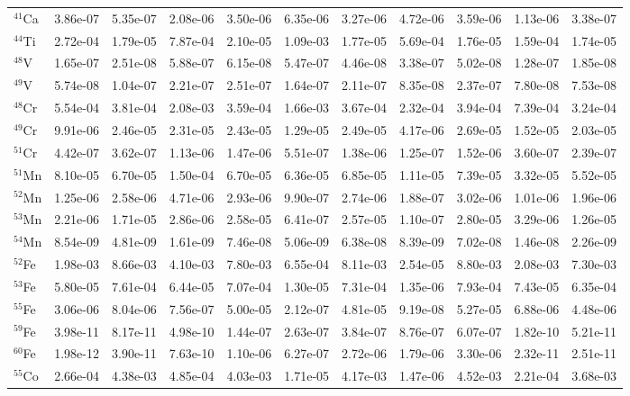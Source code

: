 \begin{landscape}
\begin{table}
\begin{tabular}{l|cc|cc|cc|cc|cc}
$^{41}$Ca & 3.86e-07 & 5.35e-07 & 2.08e-06 & 3.50e-06 & 6.35e-06 & 3.27e-06 & 4.72e-06 & 3.59e-06 & 1.13e-06 & 3.38e-07\\
$^{44}$Ti & 2.72e-04 & 1.79e-05 & 7.87e-04 & 2.10e-05 & 1.09e-03 & 1.77e-05 & 5.69e-04 & 1.76e-05 & 1.59e-04 & 1.74e-05\\
$^{48}$V & 1.65e-07 & 2.51e-08 & 5.88e-07 & 6.15e-08 & 5.47e-07 & 4.46e-08 & 3.38e-07 & 5.02e-08 & 1.28e-07 & 1.85e-08\\
$^{49}$V & 5.74e-08 & 1.04e-07 & 2.21e-07 & 2.51e-07 & 1.64e-07 & 2.11e-07 & 8.35e-08 & 2.37e-07 & 7.80e-08 & 7.53e-08\\
$^{48}$Cr & 5.54e-04 & 3.81e-04 & 2.08e-03 & 3.59e-04 & 1.66e-03 & 3.67e-04 & 2.32e-04 & 3.94e-04 & 7.39e-04 & 3.24e-04\\
$^{49}$Cr & 9.91e-06 & 2.46e-05 & 2.31e-05 & 2.43e-05 & 1.29e-05 & 2.49e-05 & 4.17e-06 & 2.69e-05 & 1.52e-05 & 2.03e-05\\
$^{51}$Cr & 4.42e-07 & 3.62e-07 & 1.13e-06 & 1.47e-06 & 5.51e-07 & 1.38e-06 & 1.25e-07 & 1.52e-06 & 3.60e-07 & 2.39e-07\\
$^{51}$Mn & 8.10e-05 & 6.70e-05 & 1.50e-04 & 6.70e-05 & 6.36e-05 & 6.85e-05 & 1.11e-05 & 7.39e-05 & 3.32e-05 & 5.52e-05\\
$^{52}$Mn & 1.25e-06 & 2.58e-06 & 4.71e-06 & 2.93e-06 & 9.90e-07 & 2.74e-06 & 1.88e-07 & 3.02e-06 & 1.01e-06 & 1.96e-06\\
$^{53}$Mn & 2.21e-06 & 1.71e-05 & 2.86e-06 & 2.58e-05 & 6.41e-07 & 2.57e-05 & 1.10e-07 & 2.80e-05 & 3.29e-06 & 1.26e-05\\
$^{54}$Mn & 8.54e-09 & 4.81e-09 & 1.61e-09 & 7.46e-08 & 5.06e-09 & 6.38e-08 & 8.39e-09 & 7.02e-08 & 1.46e-08 & 2.26e-09\\
$^{52}$Fe & 1.98e-03 & 8.66e-03 & 4.10e-03 & 7.80e-03 & 6.55e-04 & 8.11e-03 & 2.54e-05 & 8.80e-03 & 2.08e-03 & 7.30e-03\\
$^{53}$Fe & 5.80e-05 & 7.61e-04 & 6.44e-05 & 7.07e-04 & 1.30e-05 & 7.31e-04 & 1.35e-06 & 7.93e-04 & 7.43e-05 & 6.35e-04\\
$^{55}$Fe & 3.06e-06 & 8.04e-06 & 7.56e-07 & 5.00e-05 & 2.12e-07 & 4.81e-05 & 9.19e-08 & 5.27e-05 & 6.88e-06 & 4.48e-06\\
$^{59}$Fe & 3.98e-11 & 8.17e-11 & 4.98e-10 & 1.44e-07 & 2.63e-07 & 3.84e-07 & 8.76e-07 & 6.07e-07 & 1.82e-10 & 5.21e-11\\
$^{60}$Fe & 1.98e-12 & 3.90e-11 & 7.63e-10 & 1.10e-06 & 6.27e-07 & 2.72e-06 & 1.79e-06 & 3.30e-06 & 2.32e-11 & 2.51e-11\\
$^{55}$Co & 2.66e-04 & 4.38e-03 & 4.85e-04 & 4.03e-03 & 1.71e-05 & 4.17e-03 & 1.47e-06 & 4.52e-03 & 2.21e-04 & 3.68e-03\\

\end{tabular}
\end{table}
\end{landscape}
